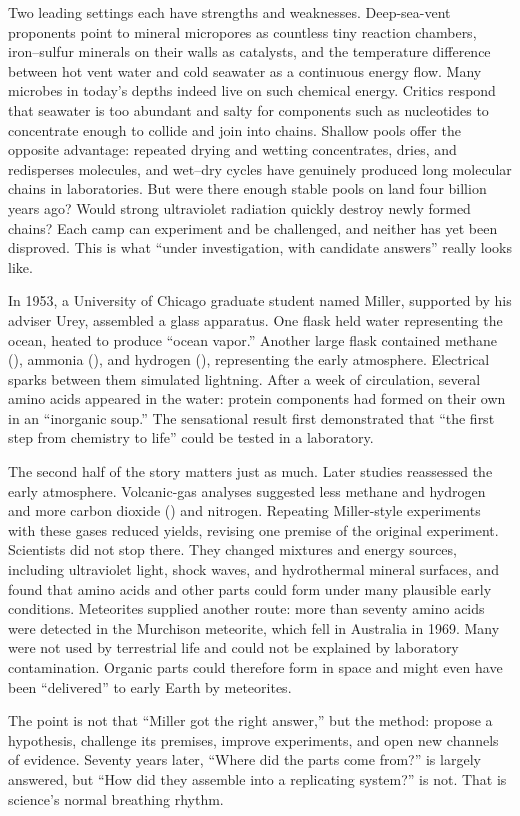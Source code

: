 Two leading settings each have strengths and weaknesses. Deep-sea-vent proponents point to mineral micropores as countless tiny reaction chambers, iron--sulfur minerals on their walls as catalysts, and the temperature difference between hot vent water and cold seawater as a continuous energy flow. Many microbes in today's depths indeed live on such chemical energy. Critics respond that seawater is too abundant and salty for components such as nucleotides to concentrate enough to collide and join into chains. Shallow pools offer the opposite advantage: repeated drying and wetting concentrates, dries, and redisperses molecules, and wet--dry cycles have genuinely produced long molecular chains in laboratories. But were there enough stable pools on land four billion years ago? Would strong ultraviolet radiation quickly destroy newly formed chains? Each camp can experiment and be challenged, and neither has yet been disproved. This is what ``under investigation, with candidate answers'' really looks like.

\begin{zhengju}
In 1953, a University of Chicago graduate student named Miller, supported by his adviser Urey, assembled a glass apparatus. One flask held water representing the ocean, heated to produce ``ocean vapor.'' Another large flask contained methane (), ammonia (), and hydrogen (), representing the early atmosphere. Electrical sparks between them simulated lightning. After a week of circulation, several amino acids appeared in the water: protein components had formed on their own in an ``inorganic soup.'' The sensational result first demonstrated that ``the first step from chemistry to life'' could be tested in a laboratory.

The second half of the story matters just as much. Later studies reassessed the early atmosphere. Volcanic-gas analyses suggested less methane and hydrogen and more carbon dioxide () and nitrogen. Repeating Miller-style experiments with these gases reduced yields, revising one premise of the original experiment. Scientists did not stop there. They changed mixtures and energy sources, including ultraviolet light, shock waves, and hydrothermal mineral surfaces, and found that amino acids and other parts could form under many plausible early conditions. Meteorites supplied another route: more than seventy amino acids were detected in the Murchison meteorite, which fell in Australia in 1969. Many were not used by terrestrial life and could not be explained by laboratory contamination. Organic parts could therefore form in space and might even have been ``delivered'' to early Earth by meteorites.

The point is not that ``Miller got the right answer,'' but the method: propose a hypothesis, challenge its premises, improve experiments, and open new channels of evidence. Seventy years later, ``Where did the parts come from?'' is largely answered, but ``How did they assemble into a replicating system?'' is not. That is science's normal breathing rhythm.
\end{zhengju}


